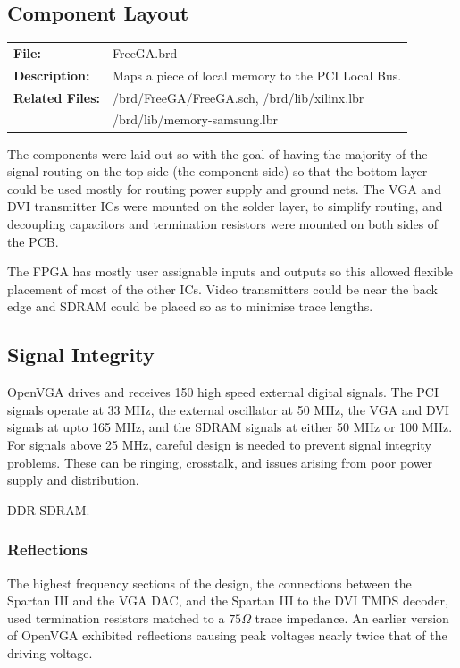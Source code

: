 \subsection{Component Layout}
\begin{tabular}{l l}
\textbf{File:}			& FreeGA.brd	\\
\textbf{Description:}	& Maps a piece of local memory to the PCI Local Bus.\\ 
\textbf{Related Files:}	& /brd/FreeGA/FreeGA.sch, /brd/lib/xilinx.lbr	\\
						& /brd/lib/memory-samsung.lbr	\\
\end{tabular}

The components were laid out so with the goal of having the majority of the
signal routing on the top-side (the component-side) so that the bottom layer
could be used mostly for routing power supply and ground nets. The VGA and DVI
transmitter ICs were mounted on the solder layer, to simplify routing, and
decoupling capacitors and termination resistors were mounted on both sides of
the PCB.

The FPGA has mostly user assignable inputs and outputs so this allowed flexible
placement of most of the other ICs. Video transmitters could be near the back
edge and SDRAM could be placed so as to minimise trace lengths.

\subsection{Signal Integrity}
\label{HARD_Signal_Integrity}
OpenVGA drives and receives 150 high speed external digital signals. The PCI
signals operate at 33 MHz, the external oscillator at 50 MHz, the VGA and DVI signals
at upto 165 MHz, and the SDRAM signals at either 50 MHz or 100 MHz. For signals
above 25 MHz, careful design is needed to prevent signal integrity
problems\cite{HighSpeedDigitalDesign}. These can be ringing, crosstalk, and
issues arising from poor power supply and distribution.

\label{PCB_DDR}
DDR SDRAM.


\subsubsection{Reflections}
The highest frequency sections of the design, the connections between the
Spartan III and the VGA DAC, and the Spartan III to the DVI TMDS decoder, used
termination resistors matched to a $75\Omega$ trace impedance. An earlier
version of OpenVGA exhibited reflections causing peak voltages nearly twice that
of the driving voltage.

